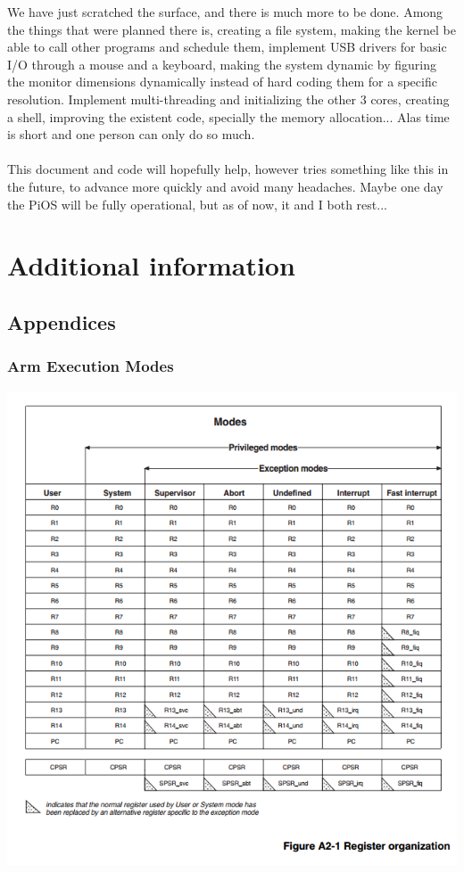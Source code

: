 \documentclass[12pt, svgnames]{book}
\begin{document}
We have just scratched the surface, and there is much more to be done. Among the things that were planned there is, creating a file system, making the kernel be able to call other programs and schedule them, implement USB drivers for basic I/O through a mouse and a keyboard, making the system dynamic by figuring the monitor dimensions dynamically instead of hard coding them for a specific resolution. Implement multi-threading and initializing the other 3 cores, creating a shell, improving the existent code, specially the memory allocation... Alas time is short and one person can only do so much. 
\\~\\
This document and code will hopefully help, however tries something like this in the future, to advance more quickly and avoid many headaches. Maybe one day the PiOS will be fully operational, but as of now, it and I both rest...

\part{Additional information}

\chapter*{Appendices}
\renewcommand{\thesection}{\Alph{section}}
\setcounter{section}{0}
\section{Arm Execution Modes}
\hypertarget{arm modes}{}

\includegraphics[scale=0.74]{ARMexecutionmodes.png}
\end{document}
